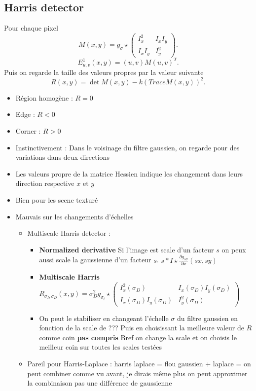 \documentclass{article}
\theoremstyle{plain}%
\theoremstyle{definition}
\theoremstyle{remark}
\begin{document}
\subsection{Harris detector}
Pour chaque pixel 
\[
    M(x,y) = g_\sigma \star \begin{pmatrix}
        I_x^2 & I_x I_y \\
        I_x I_y & I_y^2
    \end{pmatrix}
.\]
\[
    E^1_{u,v}(x, y) = (u,v)M(u,v)^T
.\]
Puis on regarde la taille des valeurs propres par la valeur suivante
\[
    R(x,y) = \det M(x,y) - k (Trace M(x,y))^2
.\]
\begin{itemize}
    \item Région homogène : $ R = 0 $
    \item Edge : $ R < 0 $
    \item Corner : $ R > 0 $
\end{itemize}

\begin{itemize}
    \item Instinctivement : Dans le voisinage du filtre gaussien, on regarde pour des variations dans deux directions
    \item Les valeurs propre de la matrice Hessien indique les changement dans leurs direction respective $ x $ et $ y $ 
    \item Bien pour les scene texturé
    \item Mauvais sur les changements d'échelles \begin{itemize}
        \item Multiscale Harris detector : \begin{itemize}
            \item \textbf{Normalized derivative} Si l'image est scale d'un facteur $ s $ on peux aussi scale la gaussienne d'un facteur $ s $. $ s * I \star \frac{\partial g_{s \sigma }}{\partial x} (sx, sy) $ 
            \item \textbf{Multiscale Harris} $ R_{\sigma _I, \sigma _D}(x,y) = \sigma _D^2 g_{\sigma _i} \star \begin{pmatrix}
                I_x^2(\sigma _D) & I_x(\sigma _D) I_y(\sigma _D) \\
                I_x(\sigma _D) I_y(\sigma _D) & I_y^2(\sigma _D)
            \end{pmatrix} $
            \item On peut le stabiliser en changeant l'échelle $ \sigma $ du filtre gaussien en fonction de la scale de ??? Puis en choisissant la meilleure valeur de $ R $ comme coin \textbf{pas compris} Bref on change la scale et on choisis le meilleur coin sur toutes les scales testées
            \end{itemize}
        \item Pareil pour Harris-Laplace : harris laplace = flou gaussien + laplace = on peut combiner comme vu avant, je dirais même plus on peut approximer la combinaison pas une différence de gaussienne
    \end{itemize}
\end{itemize}
\end{document}
